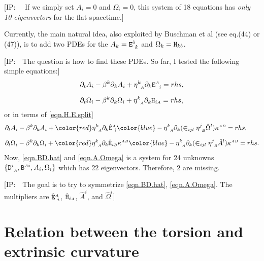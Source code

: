 \documentclass[
10pt, %
a4paper, %
oneside, %
headinclude,footinclude, %
BCOR5mm, %
]{scrartcl}
\newcommand{\IP}[1]{{\color{Red}[IP:\ \ #1]}}
\newcommand{\sA}{\mathsmaller A}
\newcommand{\sB}{\mathsmaller B}
\newcommand{\pd}[1]{\partial_{#1}}
\newcommand{\MG}[1]{\kappa^{#1}}			%
\newcommand{\itetrsymbol}{\eta}
\newcommand{\itetr}[2]{\itetrsymbol^{#1}_{\phantom{#1}#2}}
\newcommand{\Dfin}[2]{\mathtt{D}_{\phantom{#2}#1}^{#2}}	%
\newcommand{\Hfin}[2]{\mathtt{H}_{#2#1}}	%
\newcommand{\Efin}[2]{\mathtt{E}^{#1}_{\phantom{#1}#2}}	%
\newcommand{\Hfinn}[2]{\hat{\mathtt{H}}_{{#2}{#1}}}	%
\newcommand{\Efinn}[2]{\hat{\mathtt{E}}^{#1}_{\ #2}}	%
\newcommand{\Bfin}[2]{\mathtt{B}^{#1#2}}	%
\newcommand{\LCsymb}{\bm{\in}}    %
\newcommand{\indalg}[1]{\hat{\mathsmaller{#1}}}
\newcommand{\shift}[1]{\beta^{#1}}
\begin{document}
\IP{ If we simply set $ A_i = 0 $ and $ \Omega_i = 0 $, this system of 18 equations has 
\textit{only 10 eigenvectors} for the flat spacetime.}

Currently, the main natural idea, also exploited by Buschman et al \cite{Buchman2003} (see eq.(44) 
or (47)), is to add 
two PDEs for the $ A_k = \Efin{\indalg{0}}{k} $  and $ \Omega_k = \Hfin{\indalg{0}}{k} $. 

\IP{The 
question is how to find these PDEs. So far, I tested the following simple equations:}
\begin{subequations}
	\begin{align}
		&\pd{t}A_i - \shift{k}\pd{k}A_i + \itetr{k}{\sA} \pd{k} \Efin{\sA}{i} = rhs, 
		\\[2mm]
		&\pd{t}\Omega_i -\shift{k}\pd{k}\Omega_i + \itetr{k}{\sA} \pd{k} \Hfin{\sA}{i} = rhs,  
	\end{align}
\end{subequations}
or in terms of \eqref{eqn.H.E.split}
\begin{subequations}\label{eqn.A.Omega}
	\begin{align}
		&\pd{t}A_i - \shift{k}\pd{k}A_i + {\color{red}\itetr{k}{\sA} \pd{k} \Efinn{\sA}{i}}
		{\color{blue}
		-\itetr{k}{\sA} \pd{k}(	\LCsymb_{ijl} 
		\itetr{j}{\sB} \hat{\Omega}^l) \MG{\sA\sB}
		}
		 = rhs, 
		\\[2mm]
		&\pd{t}\Omega_i -\shift{k}\pd{k}\Omega_i 
		+ 
		{\color{red}\itetr{k}{\sA} \pd{k} 
		\Hfinn{\sB}{i} \MG{\sA\sB}
		} 
		{\color{blue}
		- \itetr{k}{\sA} \pd{k}(\LCsymb_{ijl} \itetr{j}{\sB} \hat{A}^l) \MG{\sA\sB}
		}= rhs.
	\end{align}
\end{subequations}
Now, \eqref{eqn.BD.hat} and \eqref{eqn.A.Omega} is a system for 24 unknowns  $ \{ 
\Dfin{\sA}{i},\Bfin{\sA}{i},A_i,\Omega_i\} $ which has 22 eigenvectors. Therefore, 2 are missing.

\IP{The goal is to try to symmetrize \eqref{eqn.BD.hat}, \eqref{eqn.A.Omega}. The multipliers are $ 
\Efinn{\sA}{i} $, $ \Hfinn{\sA}{i} $, $ \hat{A}^i $, and $ \hat{\Omega}^i $}

\section{Relation between the torsion and extrinsic curvature}
\end{document}
